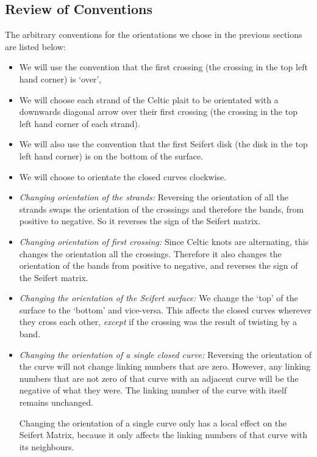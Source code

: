 \documentclass[10pt,a4paper]{report}
\theoremstyle{definition}
\theoremstyle{remark}
\theoremstyle{example}
\begin{document}
\subsection{Review of Conventions}
The arbitrary conventions for the orientations we chose in the previous sections are listed below:
\begin{itemize}
\item We will use the convention that the first crossing (the crossing in the top left hand corner) is `over', 
\item We will choose each strand of the Celtic plait to be orientated with a downwards diagonal arrow over their first crossing (the crossing in the top left hand corner of each strand). 
\item We will also use the convention that the first Seifert disk (the disk in the top left hand corner) is on the bottom of the surface.
\item We will choose to orientate the closed curves clockwise.
\end{itemize}

\begin{itemize}
\item \emph{Changing orientation of the strands:} Reversing the orientation of all the strands swaps the orientation of the crossings and therefore the bands, from positive to negative. So it reverses the sign of the Seifert matrix.
\item \emph{Changing orientation of first crossing:} Since Celtic knots are alternating, this changes the orientation all the crossings. Therefore it also changes the orientation of the bands from positive to negative, and reverses the sign of the Seifert matrix.
\item \emph{Changing the orientation of the Seifert surface:} We change the `top' of the surface to the `bottom' and vice-versa. This affects the closed curves wherever they cross each other, \emph{except} if the crossing was the result of twisting by a band. 

\item \emph{Changing the orientation of a single closed curve:} Reversing the orientation of the curve will not change linking numbers that are zero. However, any linking numbers that are not zero of that curve with an adjacent curve will be the negative of what they were. The linking number of the curve with itself remains unchanged. 
 
 Changing the orientation of a single curve only has a local effect on the Seifert Matrix, because it only affects the linking numbers of that curve with its neighbours.
\end{itemize} 
\end{document}
